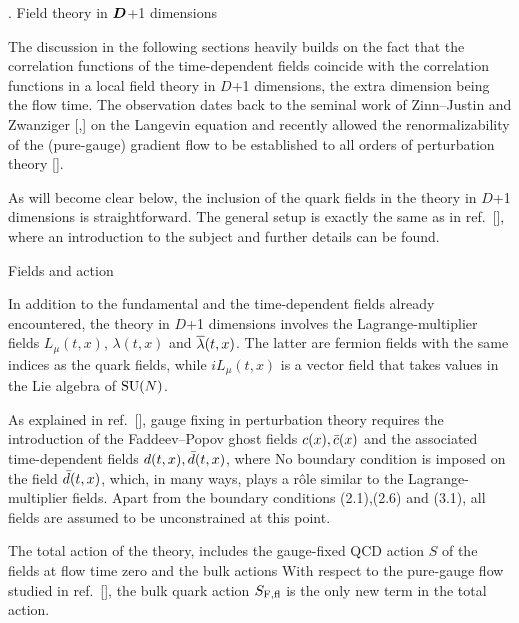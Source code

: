 

. Field theory in $\boldsymbol D$+1 dimensions

The discussion in the following sections heavily builds 
on the fact that the correlation functions 
of the time-dependent fields coincide with 
the correlation functions in
a local field theory in $D$+1 dimensions,
the extra dimension being the flow time.
The observation dates back to the seminal work of
Zinn--Justin and Zwanziger [\cite{Zinn},\cite{ZinnZwanziger}]
on the Langevin equation and recently
allowed the renormalizability 
of the (pure-gauge) gradient flow to be established 
to all orders of perturbation theory
[\cite{RenFlow}]. 

As will become clear below, the inclusion of the quark fields 
in the theory in $D$+1 dimensions is straightforward.
The general setup is exactly the same as in ref.~[\cite{RenFlow}],
where an introduction to the subject and further details 
can be found. 


 Fields and action

In addition to the fundamental and the time-dependent fields
already encountered, the theory in $D$+1 dimensions
involves the Lagrange-multiplier fields $L_{\mu}(t,x)$, $\lambda(t,x)$
and $\overline{\lambda}(t,x)$. The latter are fermion fields with
the same indices as the quark fields, while $iL_{\mu}(t,x)$ is a
vector field that takes values in the Lie algebra of ${\rm SU}(N)$. 

As explained in ref.~[\cite{RenFlow}], 
gauge fixing in perturbation theory requires the introduction of 
the Faddeev--Popov ghost
fields $c(x),\bar{c}(x)$ and the associated 
time-dependent fields $d(t,x),\bar{d}(t,x)$,
where
No boundary condition is imposed on the field $\bar{d}(t,x)$, 
which, in many ways, plays a 
r\^ole similar to the Lagrange-multiplier fields.
Apart from the boundary conditions (2.1),(2.6) and (3.1),
all fields are
assumed to be unconstrained at this point.

The total action of the theory,
includes the gauge-fixed QCD action $S$ of the fields at 
flow time zero and the bulk actions
With respect to the pure-gauge flow studied
in ref.~[\cite{RenFlow}], 
the bulk quark action $S_{\rm F,fl}$ is the only new term in the 
total action.


